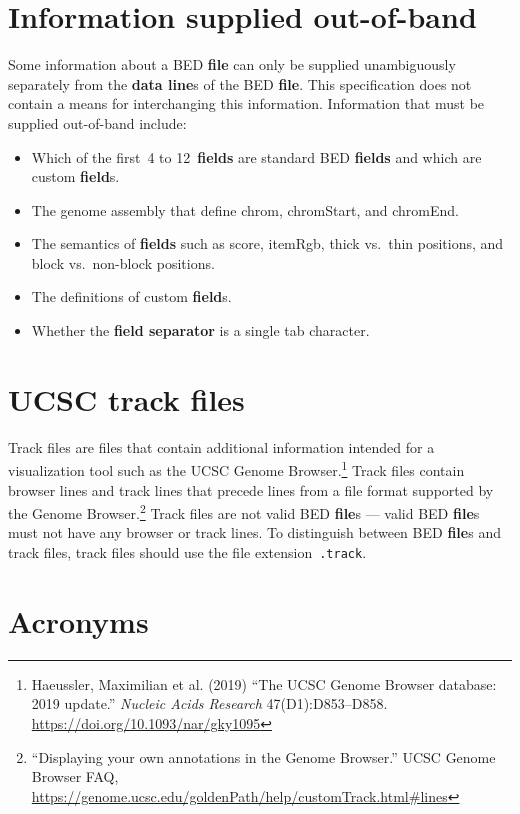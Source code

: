 \documentclass[11pt]{article}
\begin{document}
\section{Information supplied out-of-band}

Some information about a \ac{BED} \textbf{file} can only be supplied unambiguously separately from the \textbf{data line}s of the \ac{BED} \textbf{file}.
This specification does not contain a means for interchanging this information.
Information that must be supplied out-of-band include:

\begin{itemize}
    \item Which of the first~4 to 12~\textbf{fields} are standard \ac{BED} \textbf{fields} and which are custom \textbf{field}s.
    \item The genome assembly that define \textsf{chrom}, \textsf{chromStart}, and \textsf{chromEnd}.
    \item The semantics of \textbf{fields} such as \textsf{score}, \textsf{itemRgb}, thick vs.~thin positions, and block vs.~non-block positions.
    \item The definitions of custom \textbf{field}s.
    \item Whether the \textbf{field separator} is a single tab character.
\end{itemize}

\section{\acs{UCSC} track files}

Track files are files that contain additional information intended for a visualization tool such as the \ac{UCSC} Genome Browser.\footnote{Haeussler, Maximilian et al.
  (2019) ``The \acl{UCSC} Genome Browser database: 2019 update.''
  \emph{Nucleic Acids Research} 47(D1):D853--D858.
  \url{https://doi.org/10.1093/nar/gky1095}}
Track files contain browser lines and track lines that precede lines from a file format supported by the Genome Browser.\footnote{``Displaying your own annotations in the Genome Browser.'' \ac{UCSC} Genome Browser FAQ, \url{https://genome.ucsc.edu/goldenPath/help/customTrack.html\#lines}}
Track files are not valid \ac{BED} \textbf{file}s --- valid \ac{BED} \textbf{file}s must not have any browser or track lines.
To distinguish between \ac{BED} \textbf{file}s and track files, track files should use the file extension~\texttt{.track}.

\section{Acronyms}
\end{document}
